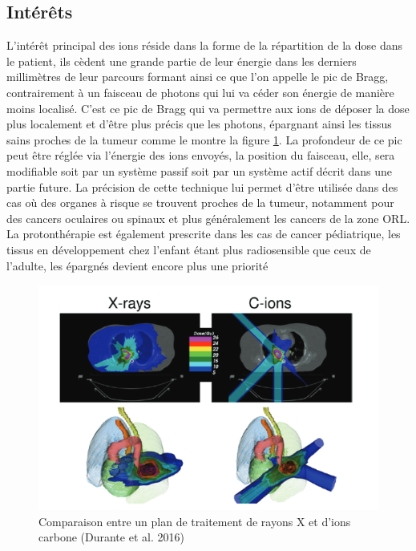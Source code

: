 \documentclass[11pt,a4paper,oldfontcommands]{memoir}
\begin{document}
\subsection{Intérêts}
L'intérêt principal des ions réside dans la forme de la répartition de la dose dans le patient, ils cèdent une grande partie de leur énergie dans les derniers millimètres de leur parcours formant ainsi ce que l'on appelle le pic de Bragg, contrairement à un faisceau de photons qui lui va céder son énergie de manière moins localisé. C'est ce pic de Bragg qui va permettre aux ions de déposer la dose plus localement et d'être plus précis que les photons, épargnant ainsi les tissus sains proches de la tumeur comme le montre la figure \ref{CvsG}. La profondeur de ce pic peut être réglée via l'énergie des ions envoyés, la position du faisceau, elle, sera modifiable soit par un système passif soit par un système actif décrit dans une partie future. La précision de cette technique lui permet d'être utilisée dans des cas où des organes à risque se trouvent proches de la tumeur, notamment pour des cancers oculaires ou spinaux et plus généralement les cancers de la zone ORL. La protonthérapie est également prescrite dans les cas de cancer pédiatrique, les tissus en développement chez l'enfant étant plus radiosensible que ceux de l'adulte, les épargnés devient encore plus une priorité \\
\begin{figure}
    \centering
    \includegraphics[scale = 0.7]{intro/xrvshDuranteetal2016.png}
    \caption{Comparaison entre un plan de traitement de rayons X et d'ions carbone (Durante et al. 2016) }
    \label{CvsG}
\end{figure}
\end{document}
